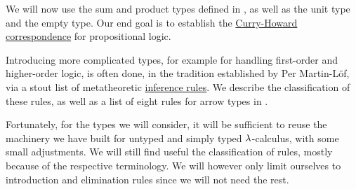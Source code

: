 \begin{remark}\label{rem:extended_simple_type_theory}
  We will now use the sum and product types defined in , as well as the unit type and the empty type. Our end goal is to establish the \hyperref[con:curry_howard_correspondence]{Curry-Howard correspondence} for propositional logic.

  Introducing more complicated types, for example for handling first-order and higher-order logic, is often done, in the tradition established by Per Martin-L\"of, via a stout list of metatheoretic \hyperref[def:inference_rule]{inference rules}. We describe the classification of these rules, as well as a list of eight rules for arrow types in .

  Fortunately, for the types we will consider, it will be sufficient to reuse the machinery we have built for untyped and simply typed \( \mathrm{\lambda} \)-calculus, with some small adjustments. We will still find useful the classification of rules, mostly because of the respective terminology. We will however only limit ourselves to introduction and elimination rules since we will not need the rest.
\end{remark}

